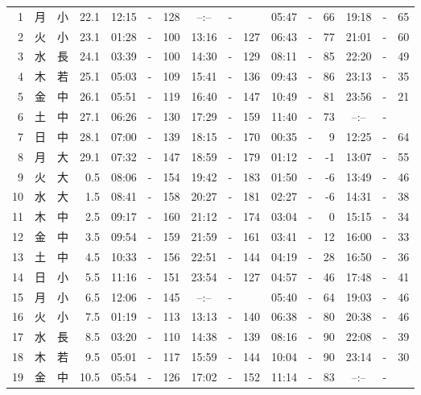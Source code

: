 \documentclass[12pt.a4j]{jsarticle}
\begin{document}
\begin{center}
\begin{table}[ht]
\begin{tabular}{|rc|cr|ccrccr|ccrccr|}
 \hline
 1 & 月 & 小 & 22.1 &  12:15 &-& 128  &  --:-- &-&     &   05:47 &-&  66  &   19:18 &-&  65  \\
 2 & 火 & 小 & 23.1 &  01:28 &-& 100  &  13:16 &-& 127  &   06:43 &-&  77  &   21:01 &-&  60  \\
 3 & 水 & 長 & 24.1 &  03:39 &-& 100  &  14:30 &-& 129  &   08:11 &-&  85  &   22:20 &-&  49  \\
 4 & 木 & 若 & 25.1 &  05:03 &-& 109  &  15:41 &-& 136  &   09:43 &-&  86  &   23:13 &-&  35  \\
 5 & 金 & 中 & 26.1 &  05:51 &-& 119  &  16:40 &-& 147  &   10:49 &-&  81  &   23:56 &-&  21  \\
 6 & 土 & 中 & 27.1 &  06:26 &-& 130  &  17:29 &-& 159  &   11:40 &-&  73  &   --:-- &-&     \\
 7 & 日 & 中 & 28.1 &  07:00 &-& 139  &  18:15 &-& 170  &   00:35 &-&   9  &   12:25 &-&  64  \\
 8 & 月 & 大 & 29.1 &  07:32 &-& 147  &  18:59 &-& 179  &   01:12 &-&  -1  &   13:07 &-&  55  \\
 9 & 火 & 大 &  0.5 &  08:06 &-& 154  &  19:42 &-& 183  &   01:50 &-&  -6  &   13:49 &-&  46  \\
10 & 水 & 大 &  1.5 &  08:41 &-& 158  &  20:27 &-& 181  &   02:27 &-&  -6  &   14:31 &-&  38  \\
11 & 木 & 中 &  2.5 &  09:17 &-& 160  &  21:12 &-& 174  &   03:04 &-&   0  &   15:15 &-&  34  \\
12 & 金 & 中 &  3.5 &  09:54 &-& 159  &  21:59 &-& 161  &   03:41 &-&  12  &   16:00 &-&  33  \\
13 & 土 & 中 &  4.5 &  10:33 &-& 156  &  22:51 &-& 144  &   04:19 &-&  28  &   16:50 &-&  36  \\
14 & 日 & 小 &  5.5 &  11:16 &-& 151  &  23:54 &-& 127  &   04:57 &-&  46  &   17:48 &-&  41  \\
15 & 月 & 小 &  6.5 &  12:06 &-& 145  &  --:-- &-&     &   05:40 &-&  64  &   19:03 &-&  46  \\
16 & 火 & 小 &  7.5 &  01:19 &-& 113  &  13:13 &-& 140  &   06:38 &-&  80  &   20:38 &-&  46  \\
17 & 水 & 長 &  8.5 &  03:20 &-& 110  &  14:38 &-& 139  &   08:16 &-&  90  &   22:08 &-&  39  \\
18 & 木 & 若 &  9.5 &  05:01 &-& 117  &  15:59 &-& 144  &   10:04 &-&  90  &   23:14 &-&  30  \\
19 & 金 & 中 & 10.5 &  05:54 &-& 126  &  17:02 &-& 152  &   11:14 &-&  83  &   --:-- &-&     \\

\end{tabular}
\end{table}
\end{center}
\end{document}
